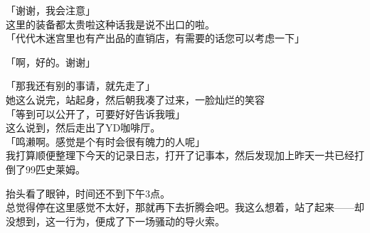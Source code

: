 「谢谢，我会注意」\\

这里的装备都太贵啦这种话我是说不出口的啦。\\

「代代木迷宫里也有产出品的直销店，有需要的话您可以考虑一下」

「啊，好的。谢谢」

「那我还有别的事请，就先走了」\\

她这么说完，站起身，然后朝我凑了过来，一脸灿烂的笑容\\

「等到可以公开了，可要好好告诉我哦」\\

这么说到，然后走出了YD咖啡厅。\\

「鸣濑啊。感觉是个有时会很有魄力的人呢」\\

我打算顺便整理下今天的记录日志，打开了记事本，然后发现加上昨天一共已经打倒了99匹史莱姆。

抬头看了眼钟，时间还不到下午3点。\\

总觉得停在这里感觉不太好，那就再下去折腾会吧。我这么想着，站了起来——却没想到，这一行为，便成了下一场骚动的导火索。\\

\sqsplit\\

